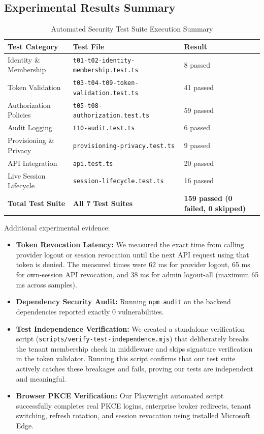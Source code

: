 \documentclass{article}
\begin{document}
\subsection*{Experimental Results Summary}
\begin{table}[h!]
\centering
\begin{tabular}{lll}
\toprule
\textbf{Test Category} & \textbf{Test File} & \textbf{Result} \\
\midrule
Identity \& Membership & \texttt{t01-t02-identity-membership.test.ts} & 8 passed \\
Token Validation & \texttt{t03-t04-t09-token-validation.test.ts} & 41 passed \\
Authorization Policies & \texttt{t05-t08-authorization.test.ts} & 59 passed \\
Audit Logging & \texttt{t10-audit.test.ts} & 6 passed \\
Provisioning \& Privacy & \texttt{provisioning-privacy.test.ts} & 9 passed \\
API Integration & \texttt{api.test.ts} & 20 passed \\
Live Session Lifecycle & \texttt{session-lifecycle.test.ts} & 16 passed \\
\midrule
\textbf{Total Test Suite} & \textbf{All 7 Test Suites} & \textbf{159 passed (0 failed, 0 skipped)} \\
\bottomrule
\end{tabular}
\caption{Automated Security Test Suite Execution Summary}
\end{table}

Additional experimental evidence:
\begin{itemize}
    \item \textbf{Token Revocation Latency:} We measured the exact time from calling provider logout or session revocation until the next API request using that token is denied. The measured times were 62 ms for provider logout, 65 ms for own-session API revocation, and 38 ms for admin logout-all (maximum 65 ms across samples).
    \item \textbf{Dependency Security Audit:} Running \texttt{npm audit} on the backend dependencies reported exactly 0 vulnerabilities.
    \item \textbf{Test Independence Verification:} We created a standalone verification script (\texttt{scripts/verify-test-independence.mjs}) that deliberately breaks the tenant membership check in middleware and skips signature verification in the token validator. Running this script confirms that our test suite actively catches these breakages and fails, proving our tests are independent and meaningful.
    \item \textbf{Browser PKCE Verification:} Our Playwright automated script successfully completes real PKCE logins, enterprise broker redirects, tenant switching, refresh rotation, and session revocation using installed Microsoft Edge.
\end{itemize}
\end{document}
